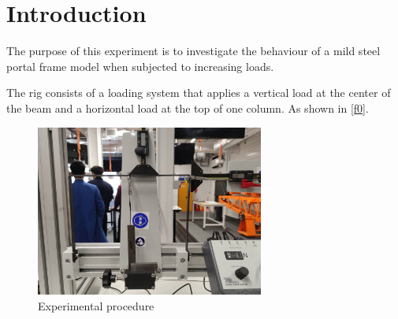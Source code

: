 \section{Introduction}

\FloatBarrier %


The purpose of this experiment is to investigate the behaviour of a mild steel portal frame model when subjected to increasing loads.

The rig consists of a loading system that applies a vertical load at the center of the beam and a horizontal load at the top of one column. As shown in \autoref{f0}.

\begin{figure}[htbp]
    \centering
    \includegraphics[width=7.5cm]{./fig/00.jpg}
    \caption{Experimental procedure}
    \label{f0}
\end{figure}




